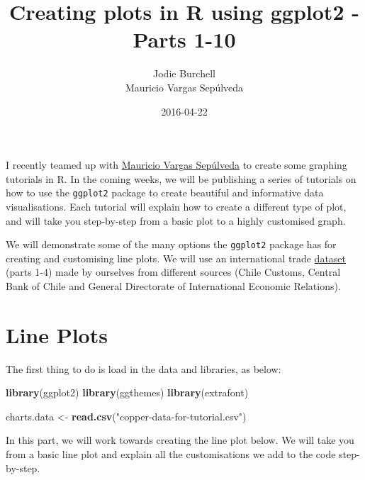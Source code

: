 \documentclass[]{article}
\title{Creating plots in R using ggplot2 - Parts 1-10}
\author{Jodie Burchell \\ Mauricio Vargas Sepúlveda}
\date{2016-04-22}
\newenvironment{Shaded}{\begin{snugshade}}{\end{snugshade}}
\newcommand{\KeywordTok}[1]{\textcolor[rgb]{0.13,0.29,0.53}{\textbf{{#1}}}}
\newcommand{\StringTok}[1]{\textcolor[rgb]{0.31,0.60,0.02}{{#1}}}
\newcommand{\NormalTok}[1]{{#1}}
\begin{document}
\maketitle

{
\setcounter{tocdepth}{2}
\tableofcontents
}
I recently teamed up with \href{http://pachamaltese.github.io/}{Mauricio
Vargas Sepúlveda} to create some graphing tutorials in R. In the coming
weeks, we will be publishing a series of tutorials on how to use the
\texttt{ggplot2} package to create beautiful and informative data
visualisations. Each tutorial will explain how to create a different
type of plot, and will take you step-by-step from a basic plot to a
highly customised graph.

We will demonstrate some of the many options the \texttt{ggplot2}
package has for creating and customising line plots. We will use an
international trade
\href{http://pachamaltese.github.io/stats/trade-chile-china/copper-data-for-tutorial.csv}{dataset}
(parts 1-4) made by ourselves from different sources (Chile Customs,
Central Bank of Chile and General Directorate of International Economic
Relations).

\section{Line Plots}\label{line-plots}

The first thing to do is load in the data and libraries, as below:

\begin{Shaded}
\begin{Highlighting}[]
\KeywordTok{library}\NormalTok{(ggplot2)}
\KeywordTok{library}\NormalTok{(ggthemes)}
\KeywordTok{library}\NormalTok{(extrafont)}

\NormalTok{charts.data <-}\StringTok{ }\KeywordTok{read.csv}\NormalTok{(}\StringTok{"copper-data-for-tutorial.csv"}\NormalTok{)}
\end{Highlighting}
\end{Shaded}

In this part, we will work towards creating the line plot below. We will
take you from a basic line plot and explain all the customisations we
add to the code step-by-step.
\end{document}
